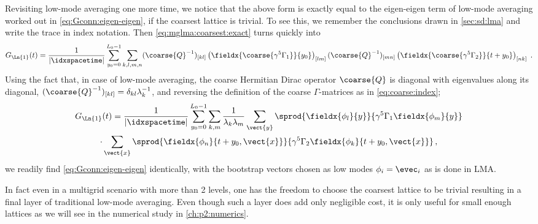 Revisiting low-mode averaging one more time, we notice that the above form is exactly equal to the eigen-eigen term of low-mode averaging worked out in \cref{eq:Gconn:eigen-eigen}, if the coarsest lattice is trivial.
To see this, we remember the conclusions drawn in \cref{sec:sd:lma} and write the trace in index notation. 
Then \cref{eq:mglma:coarsest:exact} turns quickly into
\begin{equation}
G_{\Ln{1}}(t)
= \frac{1}{\lvert \idxspacetime \rvert} \sum_{y_0=0}^{L_0-1}
\sum_{k,l,m,n}
(\coarse{Q}^{-1})_{[kl]}
\left( \fieldx{\coarse{\gamma^{5} \Gamma_1}}{y_0} \right)_{[lm]}
(\coarse{Q}^{-1})_{[mn]}
\left( \fieldx{\coarse{\gamma^{5} \Gamma_2}}{t+y_0} \right)_{[nk]} \;.
\end{equation}
Using the fact that, in case of low-mode averaging, the coarse Hermitian Dirac operator $\coarse{Q}$ is diagonal with eigenvalues along its diagonal, $(\coarse{Q}^{-1})_{[kl]} = \delta_{kl} \lambda_k^{-1}$, and reversing the definition of the coarse $\Gamma$-matrices as in \cref{eq:coarse:index};
\begin{multline}
G_{\Ln{1}}(t)
= \frac{1}{\lvert \idxspacetime \rvert} \sum_{y_0=0}^{L_0-1} \sum_{k,m}
\frac{1}{\lambda_k \lambda_m}
\sum_{\vect{y}}
\sprod{
  \fieldx{\phi_l}{y}
}{
  \gamma^{5}
  \Gamma_1
  \fieldx{\phi_m}{y}
} \\
\cdot \sum_{\vect{x}}
\sprod{
  \fieldx{\phi_n}{t+y_0,\vect{x}}
}{
  \gamma^{5}
  \Gamma_2
  \fieldx{\phi_k}{t+y_0,\vect{x}}
} \,,
\end{multline}
we readily find \cref{eq:Gconn:eigen-eigen} identically, with the bootstrap vectors chosen as low modes $\phi_i = \evec_i$ as is done in LMA.

In fact even in a multigrid scenario with more than \num{2} levels, one has the freedom to choose the coarsest lattice to be trivial resulting in a final layer of traditional low-mode averaging.
Even though such a layer does add only negligible cost, it is only useful for small enough lattices as we will see in the numerical study in \cref{ch:p2:numerics}.


